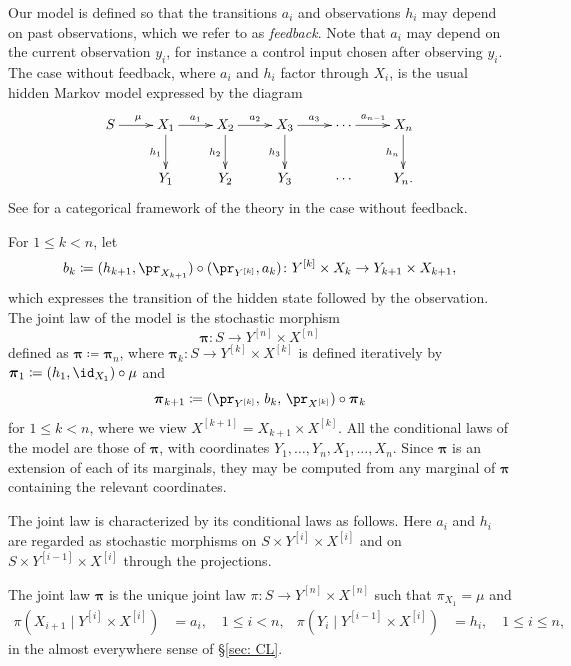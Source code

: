 \documentclass[12pt,reqno]{amsart}%
\theoremstyle{plain}
\theoremstyle{definition}
\def\bspi{\boldsymbol{\pi}}
\begin{document}
Our model is defined so that the transitions $a_i$ and observations $h_i$ may depend on past observations,
which we refer to as \emph{feedback}.
Note that $a_i$ may depend on the current observation $y_i$, for instance a control input chosen after observing $y_i$.
The case without feedback, where $a_i$ and $h_i$ factor through $X_i$,
is the usual hidden Markov model expressed by the diagram
\[
	\xymatrix{
			S\ar[r]^\mu &  X_1\ar[d]_{h_1}\ar[r]^{a_1} & X_2 \ar[d]_{h_2} \ar[r]^{a_2}
			& X_3 \ar[d]_{h_3} \ar[r]^{a_3}
			&  \cdots \ar[r]^{a_{n-1}}&  X_n \ar[d]_{h_n} \\
			 &  Y_1 & Y_2 & Y_3 & \cdots &  Y_n.
	}
\]
See \cite{F25} for a categorical framework of the theory in the case without feedback.

For $1\leq k<n$, let
\[
	b_k\coloneqq(h_{k+1},\pr_{X_{k+1}})\circ(\pr_{Y^{[k]}},a_k)\colon Y^{[k]}\times X_k\rightarrow Y_{k+1}\times X_{k+1},
\]
which expresses the transition of the hidden state followed by the observation.
The joint law of the model is the stochastic morphism
\[
	\bspi\colon S\rightarrow Y^{[n]}\times X^{[n]}
\]
defined as $\bspi\coloneqq\bspi_n$, where $\bspi_k\colon S\rightarrow Y^{[k]}\times X^{[k]}$ is defined
iteratively by $\bspi_1\coloneqq (h_1,\id_{X_1})\circ\mu$ and
\[
	\bspi_{k+1}\coloneqq(\pr_{Y^{[k]}},\,b_k,\,\pr_{X^{[k]}})\circ \bspi_{k}
\]
for $1\leq k<n$, where we view $X^{[k+1]}=X_{k+1}\times X^{[k]}$.
All the conditional laws of the model are those of $\bspi$,
with coordinates $Y_1,\ldots,Y_n,X_1,\ldots,X_n$.
Since $\bspi$ is an extension of each of its marginals, they may be computed from any marginal of $\bspi$
containing the relevant coordinates.

The joint law is characterized by its conditional laws as follows.
Here $a_i$ and $h_i$ are regarded as stochastic morphisms on $S\times Y^{[i]}\times X^{[i]}$
and on $S\times Y^{[i-1]}\times X^{[i]}$ through the projections.

\begin{proposition}\label{prop: characterization}
	The joint law $\bspi$ is the unique joint law $\pi\colon S\rightarrow Y^{[n]}\times X^{[n]}$ such that
	$\pi_{X_1}=\mu$ and
	\begin{align}
		\pi(X_{i+1}\mid Y^{[i]}\times X^{[i]})&=a_i,\quad  1\leq i< n, &
		\pi(Y_i\mid Y^{[i-1]}\times X^{[i]})&=h_i,\quad 1\leq i\leq n,\label{eq: Markov h}
	\end{align}
	in the almost everywhere sense of \S\ref{sec: CL}.
\end{proposition}
\end{document}

